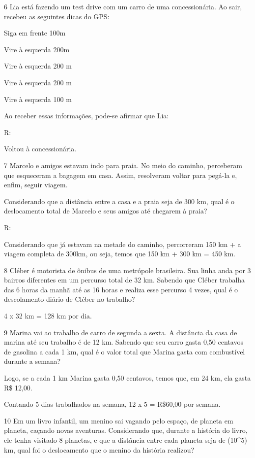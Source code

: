 {\num{6} Lia está fazendo um test drive com um carro de uma concessionária. Ao
sair, recebeu as seguintes dicas do GPS:

Siga em frente 100m

Vire à esquerda 200m

Vire à esquerda 200 m

Vire à esquerda 200 m

Vire à esquerda 100 m

Ao receber essas informações, pode-se afirmar que Lia:

R:

Voltou à concessionária.

\num{7} Marcelo e amigos estavam indo para praia. No meio do caminho,
perceberam que esqueceram a bagagem em casa. Assim, resolveram voltar
para pegá-la e, enfim, seguir viagem.

Considerando que a distância entre a casa e a praia seja de 300 km, qual
é o deslocamento total de Marcelo e seus amigos até chegarem à praia?

R:

Considerando que já estavam na metade do caminho, percorreram 150 km + a
viagem completa de 300km, ou seja, temos que 150 km + 300 km = 450 km.

\num{8} Cléber é motorista de ônibus de uma metrópole brasileira. Sua linha
anda por 3 bairros diferentes em um percurso total de 32 km. Sabendo que
Cléber trabalha das 6 horas da manhã até as 16 horas e realiza esse
percurso 4 vezes, qual é o descolamento diário de Cléber no trabalho?


4 x 32 km = 128 km por dia.

\num{9} Marina vai ao trabalho de carro de segunda a sexta. A distância da
casa de marina até seu trabalho é de 12 km. Sabendo que seu carro gasta
0,50 centavos de gasolina a cada 1 km, qual é o valor total que Marina
gasta com combustível durante a semana?


Logo, se a cada 1 km Marina gasta 0,50 centavos, temos que, em 24 km,
ela gasta R\$ 12,00.

Contando 5 dias trabalhados na semana, 12 x 5 = R\$60,00 por semana.

\num{10} Em um livro infantil, um menino sai vagando pelo espaço, de planeta
em planeta, caçando novas aventuras. Considerando que, durante a
história do livro, ele tenha visitado 8 planetas, e que a distância
entre cada planeta seja de (10^5) km, qual foi o deslocamento que o
menino da história realizou?

}
